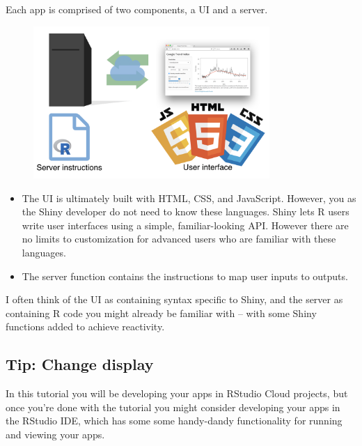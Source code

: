 \documentclass[
  letterpaper,
  DIV=11,
  numbers=noendperiod]{scrreprt}
\begin{document}
\hypertarget{section-25}{%
\subsection{}\label{section-25}}

Each app is comprised of two components, a UI and a server.

\begin{figure}

{\centering \includegraphics[width=0.8\textwidth,height=\textheight]{./images/recap-4.png}

}

\end{figure}

\begin{itemize}
\item
  The UI is ultimately built with HTML, CSS, and JavaScript. However,
  you as the Shiny developer do not need to know these languages. Shiny
  lets R users write user interfaces using a simple, familiar-looking
  API. However there are no limits to customization for advanced users
  who are familiar with these languages.
\item
  The server function contains the instructions to map user inputs to
  outputs.
\end{itemize}

I often think of the UI as containing syntax specific to Shiny, and the
server as containing R code you might already be familiar with -- with
some Shiny functions added to achieve reactivity.

\hypertarget{tip-change-display-3}{%
\subsection{Tip: Change display}\label{tip-change-display-3}}

In this tutorial you will be developing your apps in RStudio Cloud
projects, but once you're done with the tutorial you might consider
developing your apps in the RStudio IDE, which has some some handy-dandy
functionality for running and viewing your apps.
\end{document}
